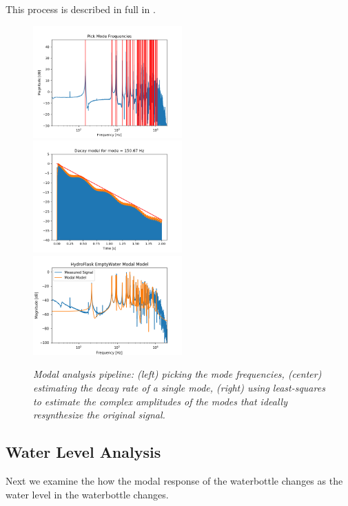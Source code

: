 \documentclass[twoside,a4paper]{article}
\begin{document}
This process is described in full in \cite{rau:das:canfielddafilou:carillon:2019}.
%
\begin{figure}
    \centering
    \includegraphics[width=2.25in]{Figures/ModePick_ex}
    \includegraphics[width=2.25in]{Figures/DecayFit_ex}
    \includegraphics[width=2.25in]{../Figures/HydroFlask/empty}
    \caption{\it{Modal analysis pipeline: (left) picking the mode frequencies,
    (center) estimating the decay rate of a single mode,
    (right) using least-squares to estimate the complex
    amplitudes of the modes that ideally resynthesize the
    original signal.}}
    \label{fig:modal_analysis}
\end{figure}
%
\subsection{Water Level Analysis} \label{sec:water}
%
Next we examine the how the modal response of the waterbottle
changes as the water level in the waterbottle changes. 
%
\end{document}
